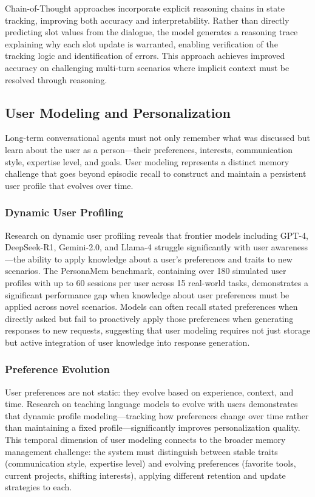 \documentclass[11pt,letterpaper]{article}
\begin{document}
Chain-of-Thought approaches incorporate explicit reasoning chains in state tracking, improving both accuracy and interpretability. Rather than directly predicting slot values from the dialogue, the model generates a reasoning trace explaining why each slot update is warranted, enabling verification of the tracking logic and identification of errors. This approach achieves improved accuracy on challenging multi-turn scenarios where implicit context must be resolved through reasoning.

\subsection{User Modeling and Personalization}

Long-term conversational agents must not only remember what was discussed but learn about the user as a person---their preferences, interests, communication style, expertise level, and goals. User modeling represents a distinct memory challenge that goes beyond episodic recall to construct and maintain a persistent user profile that evolves over time.

\subsubsection{Dynamic User Profiling}

Research on dynamic user profiling reveals that frontier models including GPT-4, DeepSeek-R1, Gemini-2.0, and Llama-4 struggle significantly with user awareness---the ability to apply knowledge about a user's preferences and traits to new scenarios. The PersonaMem benchmark, containing over 180 simulated user profiles with up to 60 sessions per user across 15 real-world tasks, demonstrates a significant performance gap when knowledge about user preferences must be applied across novel scenarios. Models can often recall stated preferences when directly asked but fail to proactively apply those preferences when generating responses to new requests, suggesting that user modeling requires not just storage but active integration of user knowledge into response generation.

\subsubsection{Preference Evolution}

User preferences are not static: they evolve based on experience, context, and time. Research on teaching language models to evolve with users demonstrates that dynamic profile modeling---tracking how preferences change over time rather than maintaining a fixed profile---significantly improves personalization quality. This temporal dimension of user modeling connects to the broader memory management challenge: the system must distinguish between stable traits (communication style, expertise level) and evolving preferences (favorite tools, current projects, shifting interests), applying different retention and update strategies to each.
\end{document}
